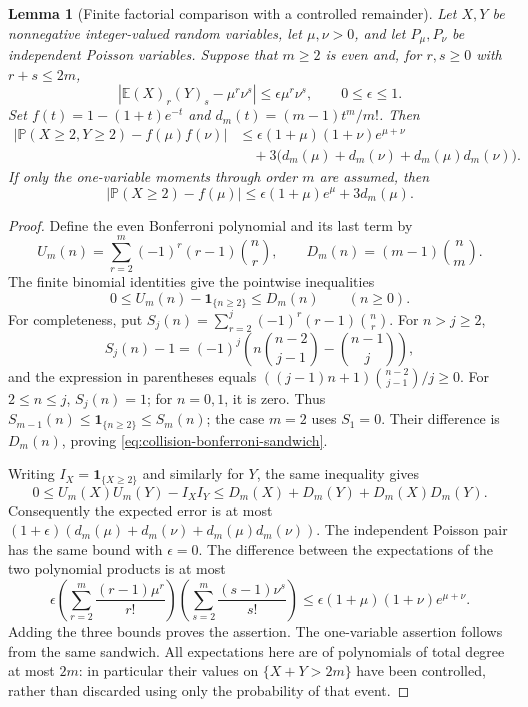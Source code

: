 \documentclass[11pt]{article}
\numberwithin{equation}{section}
\newtheorem{lemma}[lemma]{Lemma}
\newcommand{\E}{\mathbb E}
\newcommand{\Pp}{\mathbb P}
\newcommand{\1}{\mathbf 1}
\begin{document}
\begin{lemma}[Finite factorial comparison with a controlled remainder]
\label{lem:central-window}
Let $X,Y$ be nonnegative integer-valued random variables, let $\mu,\nu>0$,
and let $P_\mu,P_\nu$ be independent Poisson variables. Suppose that $m\ge2$
is even and, for $r,s\ge0$ with $r+s\le2m$,
\[
 \left|\E(X)_r(Y)_s-\mu^r\nu^s\right|
 \le\epsilon\mu^r\nu^s,\qquad 0\le\epsilon\le1.
\]
Set $f(t)=1-(1+t)e^{-t}$ and $d_m(t)=(m-1)t^m/m!$. Then
\begin{align*}
 \left|\Pp(X\ge2,Y\ge2)-f(\mu)f(\nu)\right|
 &\le \epsilon(1+\mu)(1+\nu)e^{\mu+\nu}\\
 &\quad+3\bigl(d_m(\mu)+d_m(\nu)+d_m(\mu)d_m(\nu)\bigr).
\end{align*}
If only the one-variable moments through order $m$ are assumed, then
\[
 \left|\Pp(X\ge2)-f(\mu)\right|
 \le\epsilon(1+\mu)e^\mu+3d_m(\mu).
\]
\end{lemma}

\begin{proof}
Define the even Bonferroni polynomial and its last term by
\[
 U_m(n)=\sum_{r=2}^{m}(-1)^r(r-1)\binom nr,
 \qquad D_m(n)=(m-1)\binom nm.
\]
The finite binomial identities give the pointwise inequalities
\begin{equation}
\label{eq:collision-bonferroni-sandwich}
 0\le U_m(n)-\1_{\{n\ge2\}}\le D_m(n)
 \qquad(n\ge0).
\end{equation}
For completeness, put $S_j(n)=\sum_{r=2}^{j}(-1)^r(r-1)\binom nr$.
For $n>j\ge2$,
\[
 S_j(n)-1=(-1)^j
 \left(n\binom{n-2}{j-1}-\binom{n-1}{j}\right),
\]
and the expression in parentheses equals
$((j-1)n+1)\binom{n-2}{j-1}/j\ge0$.
For $2\le n\le j$, $S_j(n)=1$; for $n=0,1$, it is zero.
Thus $S_{m-1}(n)\le\1_{\{n\ge2\}}\le S_m(n)$; the case $m=2$
uses $S_1=0$. Their difference is $D_m(n)$, proving
\eqref{eq:collision-bonferroni-sandwich}.

Writing $I_X=\1_{\{X\ge2\}}$ and similarly for $Y$, the same inequality gives
\[
 0\le U_m(X)U_m(Y)-I_XI_Y
 \le D_m(X)+D_m(Y)+D_m(X)D_m(Y).
\]
Consequently the expected error is at most
$(1+\epsilon)(d_m(\mu)+d_m(\nu)+d_m(\mu)d_m(\nu))$.
The independent Poisson pair has the same bound with $\epsilon=0$.
The difference between the expectations of the two polynomial products is
at most
\[
 \epsilon\left(\sum_{r=2}^{m}\frac{(r-1)\mu^r}{r!}\right)
 \left(\sum_{s=2}^{m}\frac{(s-1)\nu^s}{s!}\right)
 \le\epsilon(1+\mu)(1+\nu)e^{\mu+\nu}.
\]
Adding the three bounds proves the assertion. The one-variable assertion
follows from the same sandwich. All expectations here are of polynomials of
total degree at most $2m$: in particular their values on $\{X+Y>2m\}$ have
been controlled, rather than discarded using only the probability of that event.
\end{proof}
\end{document}
